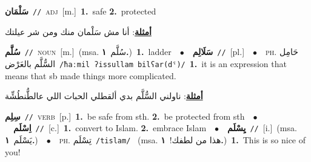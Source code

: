 \documentclass[10pt,a4paper,twoside]{article} %
\begin{document}
\begin{multicols}{2}
{\setlength\topsep{0pt}\textbf{\foreignlanguage{arabic}{سَلْمَان}}\ {\color{gray}\texttt{//}\color{black}}\ \textsc{adj}\ [m.]\ \textbf{1.}~safe  \textbf{2.}~protected\  \begin{flushright}\color{gray}\foreignlanguage{arabic}{\textbf{\underline{\foreignlanguage{arabic}{أمثلة}}}: أنا مش سَلْمان منك ومن شر عيلتك}\end{flushright}\color{black}} \vspace{2mm}

{\setlength\topsep{0pt}\textbf{\foreignlanguage{arabic}{سُلَّم}}\ {\color{gray}\texttt{//}\color{black}}\ \textsc{noun}\ [m.]\ \color{gray}(msa. \foreignlanguage{arabic}{سُلَّم}~\foreignlanguage{arabic}{\textbf{١.}})\color{black}\ \textbf{1.}~ladder\ \ $\bullet$\ \ \setlength\topsep{0pt}\textbf{\foreignlanguage{arabic}{سَلَالِم}}\ {\color{gray}\texttt{//}\color{black}}\ [pl.]\ \ $\bullet$\ \ \textsc{ph.} \color{gray} \foreignlanguage{arabic}{حَامِل السُّلَّم بالعَرْض}\color{black}\ {\color{gray}\texttt{/{\sffamily ħaːmil ʔissullam bilʕar(dˤ)}/}\color{black}}\ \textbf{1.}~it is an expression that means that sb made things more complicated.\  \begin{flushright}\color{gray}\foreignlanguage{arabic}{\textbf{\underline{\foreignlanguage{arabic}{أمثلة}}}: ناولني السُّلَّم بدي ألقطلي الحبات اللي عالطُّنطُشِّة}\end{flushright}\color{black}} \vspace{2mm}

{\setlength\topsep{0pt}\textbf{\foreignlanguage{arabic}{سِلِم}}\ {\color{gray}\texttt{//}\color{black}}\ \textsc{verb}\ [p.]\ \textbf{1.}~be safe from sth.  \textbf{2.}~be protected from sth\ \ $\bullet$\ \ \setlength\topsep{0pt}\textbf{\foreignlanguage{arabic}{اِسْلَم}}\ {\color{gray}\texttt{//}\color{black}}\ [c.]\ \textbf{1.}~convert to Islam.  \textbf{2.}~embrace Islam\ \ $\bullet$\ \ \setlength\topsep{0pt}\textbf{\foreignlanguage{arabic}{يِسْلَم}}\ {\color{gray}\texttt{//}\color{black}}\ [i.]\ \color{gray}(msa. \foreignlanguage{arabic}{يَسْلَم}~\foreignlanguage{arabic}{\textbf{١.}})\color{black}\ \ $\bullet$\ \ \textsc{ph.} \color{gray} \foreignlanguage{arabic}{تِسْلَم}\color{black}\ {\color{gray}\texttt{/{\sffamily tislam}/}\color{black}}\ \color{gray} (msa. \foreignlanguage{arabic}{هذا من لطفك!}~\foreignlanguage{arabic}{\textbf{١.}})\color{black}\ \textbf{1.}~This is so nice of you!\ } \vspace{2mm}


\end{multicols}
\end{document}
